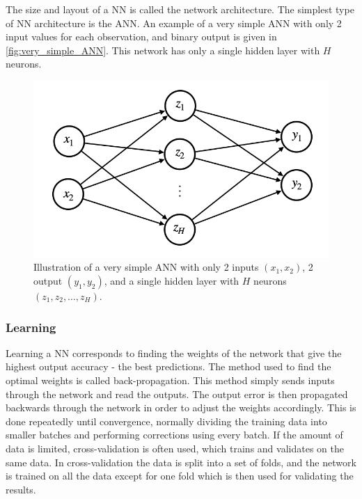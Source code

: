 The size and layout of a NN is called the network architecture. The simplest type of NN architecture is the ANN. An example of a very simple ANN with only 2 input values for each observation, and binary output is given in \autoref{fig:very_simple_ANN}. This network has only a single hidden layer with $H$ neurons. 
\begin{figure}
    \centering
    \captionsetup{width=.95\linewidth}
    \includegraphics[width=.6\linewidth]{Pics/02_Theory/simple_ANN.png}
    \caption{Illustration of a very simple ANN with only 2 inputs $(x_1, x_2)$, 2 output $(y_1, y_2)$, and a single hidden layer with $H$ neurons $(z_1, z_2,\dots ,z_H)$.}
    \label{fig:very_simple_ANN}
\end{figure}

\subsubsection{Learning}
Learning a NN corresponds to finding the weights of the network that give the highest output accuracy - the best predictions. The method used to find the optimal weights is called back-propagation. This method simply sends inputs through the network and read the outputs. The output error is then propagated backwards through the network in order to adjust the weights accordingly. This is done repeatedly until convergence, normally dividing the training data into smaller batches and performing corrections using every batch. If the amount of data is limited, cross-validation is often used, which trains and validates on the same data. In cross-validation the data is split into a set of folds, and the network is trained on all the data except for one fold which is then used for validating the results.

